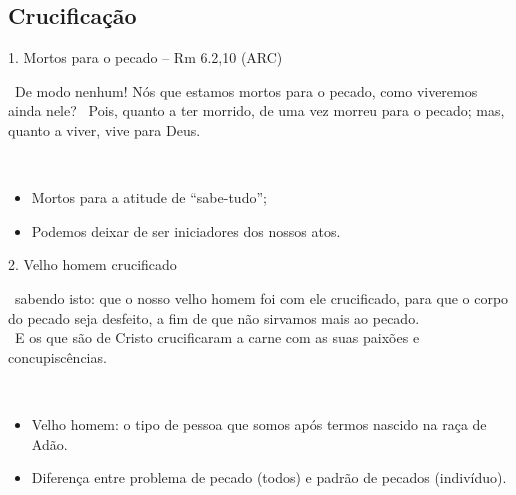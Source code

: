 \documentclass[12pt,aspectratio=169]{beamer}
\newcommand{\ver}[1]{%
    \raisebox{0.50ex}{%
        \scalebox{1.1}{%
            \pmb{\textbf{\textcolor{BSpbg}{#1}}}%
        }%
    }%
}
\newcommand{\QUOTE}[1]{%
    \par\noindent\hspace*{0.05\linewidth}%
    \begin{minipage}{0.9\linewidth}%
        \linespread{1.35}\large{#1}%
    \end{minipage}%
}
\newcommand{\YEL}[1]{{\textcolor{TXyel}{#1}}}
\newcommand{\BRI}[1]{{\textcolor{BSpbg}{#1}}}   %
\begin{document}
    \subsection{Crucificação}

    \begin{frame}{1. \YEL{Mortos para o pecado} -- Rm 6.2,10 (ARC)}
        \QUOTE{%
            \ver{2}~De modo nenhum! \YEL{Nós} que \YEL{estamos mortos para o pecado}, como
            viveremos ainda nele?
            \ver{10}~Pois, quanto a ter morrido, de uma vez \YEL{morreu para o pecado}; mas,
            quanto a viver, vive para Deus.
        }
        \\[1.5\bigskipamount]
        \begin{itemize}
            \item<2-> Mortos para a atitude de ``sabe-tudo'';
            \item<3-> Podemos deixar de ser iniciadores dos nossos atos.
        \end{itemize}
    \end{frame}

    \begin{frame}{2. \YEL{Velho homem crucificado}}
        \QUOTE{%
            \ver{Rm 6.6 (ARC)}~sabendo isto: que o nosso velho homem \YEL{foi com ele
            crucificado}, para que o corpo do pecado seja desfeito, a fim de que não sirvamos
            mais ao pecado.
            \\[\bigskipamount]
            \ver{Gl 5.24 (ARC)}~E os que são de Cristo \YEL{crucificaram a carne} com as suas
            paixões e concupiscências.
        }
        \\[1.5\bigskipamount]
        \begin{itemize}
            \item<2-> Velho homem: o \BRI{tipo de pessoa} que somos após termos nascido na raça
                de Adão.
            \item<3-> Diferença entre \BRI{problema} de pecado (todos) e \BRI{padrão} de pecados
                (indivíduo).
        \end{itemize}
    \end{frame}

\end{document}
